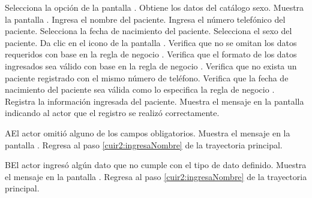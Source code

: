 \begin{UCtrayectoria}
	\UCpaso[\UCactor] Selecciona la opción \btnRegistro{} de la pantalla .
	\UCpaso[\UCsist] Obtiene los datos del catálogo sexo.
	\UCpaso[\UCsist] Muestra la pantalla .
	\UCpaso[\UCactor] \label{cuir2:ingresaNombre}Ingresa el nombre del paciente.
	\UCpaso[\UCactor] Ingresa el número telefónico del paciente.
	\UCpaso[\UCactor] Selecciona la fecha de nacimiento del paciente.
	\UCpaso[\UCactor] Selecciona el sexo del paciente.
	\UCpaso[\UCactor] Da clic en el icono \btnRegistrar{} de la pantalla .
	\UCpaso[\UCsist] Verifica que no se omitan los datos requeridos con base en la regla de negocio . 
	\UCpaso[\UCsist] Verifica que el formato de los datos ingresados sea válido con base en la regla de negocio . 
	\UCpaso[\UCsist] Verifica que no exista un paciente registrado con el mismo número de teléfono. 
	\UCpaso[\UCsist] Verifica que la fecha de nacimiento del paciente sea válida como lo especifica la regla de negocio . 
	\UCpaso[\UCsist] Registra la información ingresada del paciente.
	\UCpaso[\UCsist] Muestra el mensaje  en la pantalla  indicando al actor que el registro se realizó correctamente.
\end{UCtrayectoria}


\begin{UCtrayectoriaA}{A}{El actor omitió alguno de los campos obligatorios.}
	\UCpaso[\UCsist] Muestra el mensaje  en la pantalla .
	\UCpaso[] Regresa al paso \ref{cuir2:ingresaNombre} de la trayectoria principal.
\end{UCtrayectoriaA}

\begin{UCtrayectoriaA}{B}{El actor ingresó algún dato que no cumple con el tipo de dato definido.}
	\UCpaso[\UCsist] Muestra el mensaje  en la pantalla .
	\UCpaso[] Regresa al paso \ref{cuir2:ingresaNombre} de la trayectoria principal.
\end{UCtrayectoriaA}

